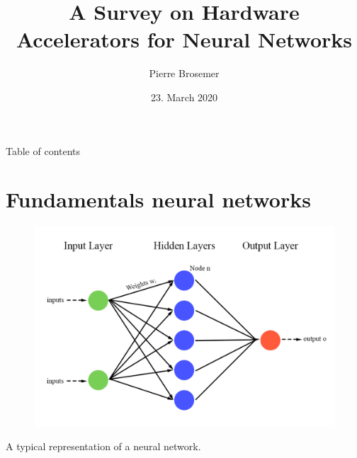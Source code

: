 \documentclass[en]{sdqbeamer}
\title[Hardware Accelerators for Neural Networks]{A Survey on Hardware Accelerators for Neural Networks}
\author[Pierre Brosemer]{Pierre Brosemer}
\date[23.\,03.\,2020]{23. March 2020}
\begin{document}
	
	\KITtitleframe
	
	\begin{frame}{Table of contents}
		\tableofcontents
	\end{frame}
	
	\section{Fundamentals neural networks}
	\begin{frame}
		\begin{figure}
			\includegraphics[width= 0.6\paperwidth]{pictures/neuralnetwork.png}
		\end{figure}
		\centering
		A typical representation of a neural network.
	\end{frame}
	
\end{document}
